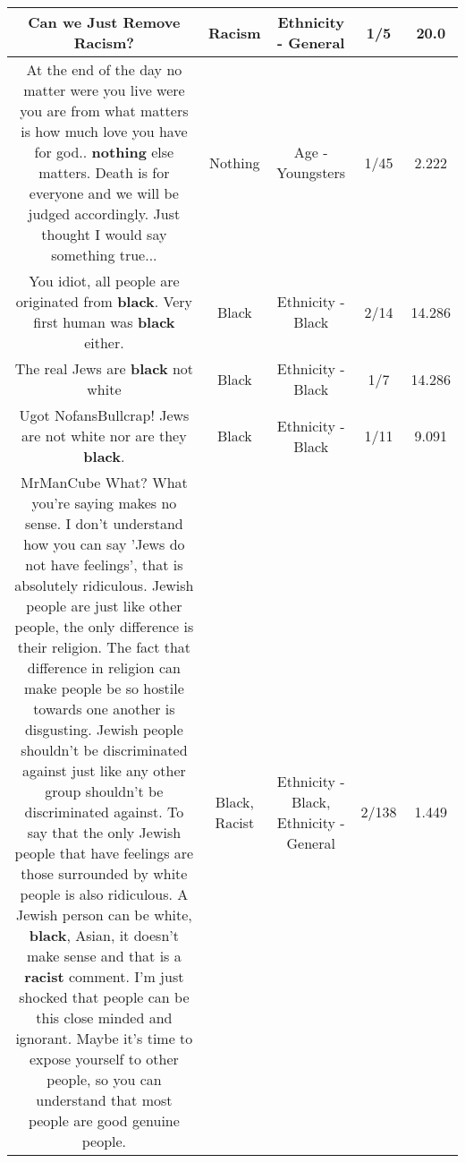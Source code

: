 \documentclass[11pt]{article}
\newlength\mylength
\begin{document}
\begin{center}
\begin{longtable}{|C{.65\mylength}|C{.30\mylength}|C{.12\mylength}|C{.12\mylength}|C{.12\mylength}|}
  \small Can we Just Remove \textbf{Racism}?\normalsize   & Racism & Ethnicity - General & 1/5 & 20.0 \\  \hline
  \small At the end of the day no matter were you live were you are from what matters is how much love you have for god.. \textbf{nothing} else matters. Death is for everyone and we will be judged accordingly. Just thought I would say something true...\normalsize   & Nothing & Age - Youngsters & 1/45 & 2.222 \\  \hline
  \small You idiot, all people are originated from \textbf{black}. Very first human was \textbf{black} either.\normalsize   & Black & Ethnicity - Black & 2/14 & 14.286 \\  \hline
  \small The real Jews are \textbf{black} not white\normalsize   & Black & Ethnicity - Black & 1/7 & 14.286 \\  \hline
  \small Ugot NofansBullcrap! Jews are not white nor are they \textbf{black}.\normalsize   & Black & Ethnicity - Black & 1/11 & 9.091 \\  \hline
  \small MrManCube What? What you're saying makes no sense. I don't understand how you can say 'Jews do not have feelings', that is absolutely ridiculous. Jewish people are just like other people, the only difference is their religion. The fact that difference in religion can make people be so hostile towards one another is disgusting. Jewish people shouldn't be discriminated against just like any other group shouldn't be discriminated against. To say that the only Jewish people that have feelings are those surrounded by white people is also ridiculous. A Jewish person can be white, \textbf{black}, Asian, it doesn't make sense and that is a \textbf{racist} comment. I'm just shocked that people can be this close minded and ignorant. Maybe it's time to expose yourself to other people, so you can understand that most people are good genuine people.\normalsize   & Black, Racist & Ethnicity - Black, Ethnicity - General & 2/138 & 1.449 \\  \hline

\end{longtable}
\end{center}
\end{document}
